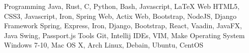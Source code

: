 \begin{cvskills}
	\cvskill
	  {Programming}
	  {Java, Rust, C, Python, Bash, Javascript, LaTeX}
	\cvskill
	  {Web}
	  {HTML5, CSS3, Javascript, Iron, Spring Web, Actix Web, Bootstrap, NodeJS, Django}
	\cvskill
	  {Framework}
	  {Spring, Express, Iron, Django, Bootstrap, React, Vaadin, JavaFX, Java Swing, Passport.js}
	\cvskill
	  {Tools}
	  {Git, Intellij IDEs, VIM, Make}
	\cvskill
	  {Operating System}
	  {Windows 7-10, Mac OS X, Arch Linux, Debain, Ubuntu, CentOS}
\end{cvskills}
